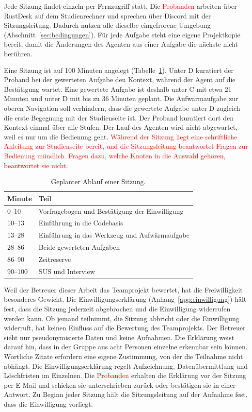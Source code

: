Jede Sitzung findet einzeln per Fernzugriff statt. Die \textcolor{red}{Probanden} arbeiten über RustDesk auf dem Studienrechner und sprechen über Discord mit der Sitzungsleitung. Dadurch nutzen alle dieselbe eingefrorene Umgebung (Abschnitt~\ref{sec:bedingungen}). Für jede Aufgabe steht eine eigene Projektkopie bereit, damit die Änderungen des Agenten aus einer Aufgabe die nächste nicht berühren.

Eine Sitzung ist auf 100 Minuten angelegt (Tabelle~\ref{tab:ablauf}). Unter D kuratiert der Proband bei der gewerteten Aufgabe den Kontext, während der Agent auf die Bestätigung wartet. Eine gewertete Aufgabe ist deshalb unter C mit etwa 21 Minuten und unter D mit bis zu 36 Minuten geplant. Die Aufwärmaufgabe zur oberen Navigation soll verhindern, dass die gewertete Aufgabe unter D zugleich die erste Begegnung mit der Studienseite ist. Der Proband kuratiert dort den Kontext einmal über alle Stufen. Der Lauf des Agenten wird nicht abgewartet, weil es nur um die Bedienung geht. \textcolor{red}{Während der Sitzung liegt eine schriftliche Anleitung zur Studienseite bereit, und die Sitzungsleitung beantwortet Fragen zur Bedienung mündlich. Fragen dazu, welche Knoten in die Auswahl gehören, beantwortet sie nicht.}

\begin{table}[H]
  \centering
  \caption{Geplanter Ablauf einer Sitzung.}
  \label{tab:ablauf}
  \small
  \begin{tabular}{ll}
    \toprule
    Minute & Teil \\
    \midrule
    0--10 & Vorfragebogen und Bestätigung der Einwilligung \\
    10--13 & Einführung in die Codebasis \\
    13--28 & Einführung in das Werkzeug und Aufwärmaufgabe \\
    28--86 & Beide gewerteten Aufgaben \\
    86--90 & Zeitreserve \\
    90--100 & SUS und Interview \\
    \bottomrule
  \end{tabular}
\end{table}

Weil der Betreuer dieser Arbeit das Teamprojekt bewertet, hat die Freiwilligkeit besonderes Gewicht. Die Einwilligungserklärung (Anhang~\ref{app:einwilligung}) hält fest, dass die Sitzung jederzeit abgebrochen und die Einwilligung widerrufen werden kann. Ob jemand teilnimmt, die Sitzung abbricht oder die Einwilligung widerruft, hat keinen Einfluss auf die Bewertung des Teamprojekts. Der Betreuer sieht nur pseudonymisierte Daten und keine Aufnahmen. Die Erklärung weist darauf hin, dass in der Gruppe aus acht Personen einzelne erkennbar sein können. Wörtliche Zitate erfordern eine eigene Zustimmung, von der die Teilnahme nicht abhängt. Die Einwilligungserklärung regelt Aufzeichnung, Datenübermittlung und Löschfristen im Einzelnen. Die \textcolor{red}{Probanden} erhalten die Erklärung vor der Sitzung per E-Mail und schicken sie unterschrieben zurück oder bestätigen sie in einer Antwort. Zu Beginn jeder Sitzung hält die Sitzungsleitung auf der Aufnahme fest, dass die Einwilligung vorliegt.

